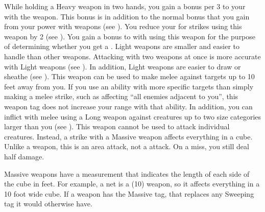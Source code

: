         While holding a Heavy weapon in two hands, you gain a  bonus per 3  to your  with the weapon.
        This bonus is in addition to the normal bonus that you gain from your power with weapons (see ).
         You reduce your  for strikes using this weapon by 2 (see ).
         You gain a  bonus to  with  using this weapon for the purpose of determining whether you get a .
         Light weapons are smaller and easier to handle than other weapons.
        Attacking with two weapons at once is more accurate with Light weapons (see ).
        In addition, Light weapons are easier to draw or sheathe (see ).
        \label{Long Weapon} This weapon can be used to make melee  against targets up to 10 feet away from you.
        If you use an ability with more specific targets than simply making a melee strike, such as affecting ``all enemies adjacent to you'', this weapon tag does not increase your range with that ability.
        In addition, you can inflict  with melee  using a Long weapon against creatures up to two size categories larger than you (see ).
         This weapon cannot be used to attack individual creatures.
        Instead, a strike with a Massive weapon affects everything in a cube.
        Unlike a  weapon, this is an area attack, not a  attack.
        On a miss, you still deal half damage.

        Massive weapons have a measurement that indicates the length of each side of the cube in feet.
        For example, a net is a  (10) weapon, so it affects everything in a 10 foot wide cube.
        If a weapon has the Massive tag, that replaces any Sweeping tag it would otherwise have.

